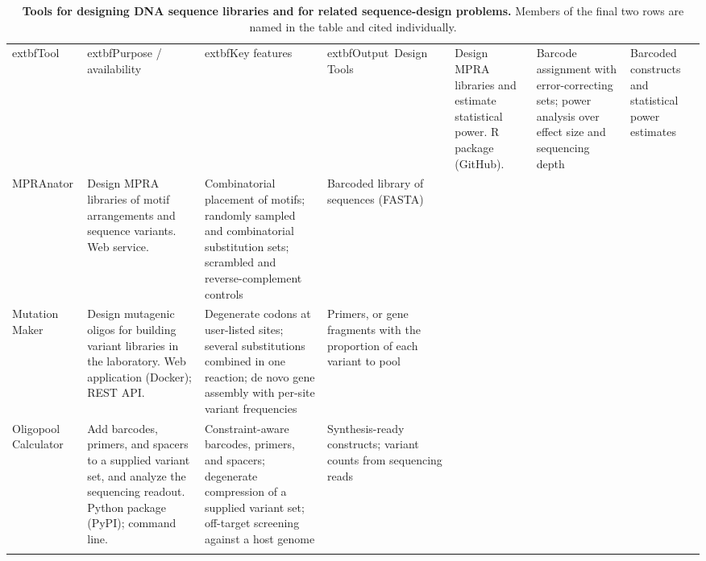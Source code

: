 \begin{table}
\centering
\footnotesize
\setlength{\tabcolsep}{3pt}
\renewcommand{\arraystretch}{1.1}
\caption{\textbf{Tools for designing DNA sequence libraries and for
related sequence-design problems.} Members of the final two rows are named in the
table and cited individually.}
\label{tab:tools}
\begin{tabular}{@{}>{\raggedright\arraybackslash}p{2.0cm}>{\raggedright\arraybackslash}p{3.4cm}>{\raggedright\arraybackslash}p{5.45cm}>{\raggedright\arraybackslash}p{3.6cm}>{\raggedright\arraybackslash}p{2.7cm}l@{}}
\toprule
	extbf{Tool} & 	extbf{Purpose / availability} & 	extbf{Key features} &
	extbf{Output}\
\midruleMPRA Design Tools \citep{Ghazi2018aa} &
Design MPRA libraries and estimate statistical power. R package (GitHub). &
Barcode assignment with error-correcting sets; power analysis over effect
size and sequencing depth &
Barcoded constructs and statistical power estimates\\
\addlinespace

MPRAnator \citep{GeorgakopoulosSoares2017gb} &
Design MPRA libraries of motif arrangements and sequence variants. Web
service. &
Combinatorial placement of motifs; randomly sampled and combinatorial
substitution sets; scrambled and reverse-complement controls &
Barcoded library of sequences (FASTA)\\
\addlinespace

Mutation Maker \citep{Hiraga2021yg} &
Design mutagenic oligos for building variant libraries in the laboratory.
Web application (Docker); REST API. &
Degenerate codons at user-listed sites; several substitutions combined in
one reaction; de novo gene assembly with per-site variant frequencies &
Primers, or gene fragments with the proportion of each variant to pool\\
\addlinespace

Oligopool Calculator \citep{Hossain2024oc} &
Add barcodes, primers, and spacers to a supplied variant set, and analyze
the sequencing readout. Python package (PyPI); command line. &
Constraint-aware barcodes, primers, and spacers; degenerate compression of
a supplied variant set; off-target screening against a host genome &
Synthesis-ready constructs; variant counts from sequencing reads\\
\addlinespace


\end{tabular}
\end{table}
